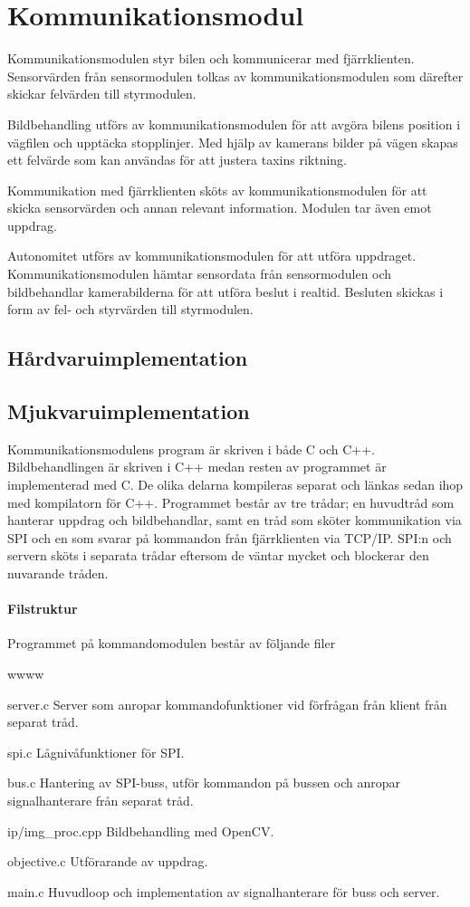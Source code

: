 \documentclass[tekniskrapport/tech.tex]{subfiles}
\begin{document}
\section{Kommunikationsmodul}
Kommunikationsmodulen styr bilen och kommunicerar med fjärrklienten.
Sensorvärden från sensormodulen tolkas av kommunikationsmodulen som därefter
skickar felvärden till styrmodulen.

Bildbehandling utförs av kommunikationsmodulen för att
avgöra bilens position i vägfilen och upptäcka stopplinjer. Med hjälp av
kamerans bilder på vägen skapas ett felvärde som kan användas för att justera
taxins riktning.

Kommunikation med fjärrklienten sköts av kommunikationsmodulen för
att skicka sensorvärden och annan relevant information. Modulen tar
även emot uppdrag.

Autonomitet utförs av kommunikationsmodulen för att utföra uppdraget.
Kommunikationsmodulen hämtar sensordata från sensormodulen och bildbehandlar
kamerabilderna för att utföra beslut i realtid. Besluten skickas i form av fel-
och styrvärden till styrmodulen.

\subsection{Hårdvaruimplementation} 

\subsection{Mjukvaruimplementation}
Kommunikationsmodulens program är skriven i både C och C++. Bildbehandlingen är
skriven i C++ medan resten av programmet är implementerad med C. De olika
delarna kompileras separat och länkas sedan ihop med kompilatorn för C++.
Programmet består av tre trådar; en huvudtråd som hanterar uppdrag och
bildbehandlar, samt en tråd som sköter kommunikation via SPI och en som svarar
på kommandon från fjärrklienten via TCP/IP. SPI:n och servern sköts i separata
trådar eftersom de väntar mycket och blockerar den nuvarande tråden.

\paragraph{Filstruktur}
Programmet på kommandomodulen består av följande filer

\begin{labeling}{wwww}
    \item[server.c] Server som anropar kommandofunktioner vid förfrågan från
        klient från separat tråd.
	\item[spi.c] Lågnivåfunktioner för SPI.
    \item[bus.c] Hantering av SPI-buss, utför kommandon på bussen och anropar
        signalhanterare från separat tråd.
    \item[ip/img\_proc.cpp] Bildbehandling med OpenCV.
    \item[objective.c] Utförarande av uppdrag.
    \item[main.c] Huvudloop och implementation av signalhanterare för buss och
        server.
\end{labeling}
\end{document}
